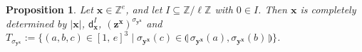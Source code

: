 \documentclass[11pt,a4paper,reqno]{amsart}
\numberwithin{equation}{section}
\theoremstyle{plain}
\newtheorem{prop}[thm]{Proposition}
\theoremstyle{definition}
\newtheorem{Def}[thm]{Definition}
\theoremstyle{remark}
\numberwithin{equation}{section}
\newcommand{\bbone}{\mathbbm{1}}
\newcommand{\bx}{\mathbf{x}}
\newcommand{\by}{\mathbf{y}}
\newcommand{\bz}{\mathbf{z}}
\renewcommand{\min}{\mathrm{min}}
\newcommand{\ZZ}{\mathbb{Z}}
\newcommand{\Ht}{\mathsf{ht}}
\newcommand{\dd}{\mathsf{d}}
\newcommand{\ft}[2]{\llparenthesis\, #1,#2 \,\rrparenthesis}
\begin{document}

\begin{prop} \label{P:unique-x}
Let $\bx \in \ZZ^e$, and let $I \subseteq \ZZ/\ell\ZZ$ with $0 \in I$.
Then $\bx$ is completely determined by $|\bx|$, $\dd_{\bx}^I$, $(\bz^{\bx})^{\sigma_{\by^{\bx}}}$ and $T_{\sigma_{\by^{\bx}}} := \{ (a,b,c) \in [1,\,e]^3 \mid \sigma_{\by^{\bx}}(c) \in \ft{\sigma_{\by^{\bx}}(a)}{\sigma_{\by^{\bx}}(b)} \}$.
\end{prop}
\end{document}
